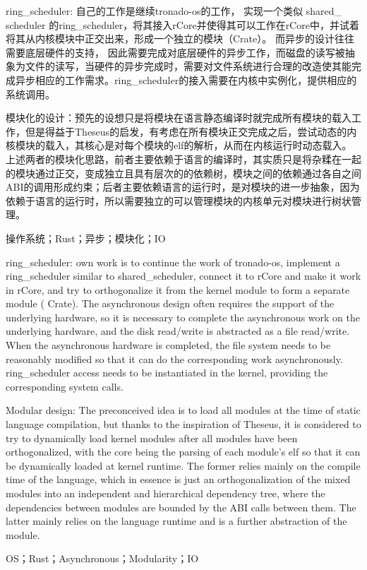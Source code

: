 \setlength{\headheight}{1.5cm}

\abstractcn

ring\_scheduler: 自己的工作是继续tronado-os的工作， 实现一个类似 shared\_ scheduler 的ring\_scheduler，将其接入rCore并使得其可以工作在rCore中，并试着将其从内核模块中正交出来，形成一个独立的模块（Crate）。 而异步的设计往往需要底层硬件的支持， 因此需要完成对底层硬件的异步工作，而磁盘的读写被抽象为文件的读写，当硬件的异步完成时，需要对文件系统进行合理的改造使其能完成异步相应的工作需求。ring\_scheduler的接入需要在内核中实例化，提供相应的系统调用。

模块化的设计：预先的设想只是将模块在语言静态编译时就完成所有模块的载入工作，但是得益于Theseus的启发，有考虑在所有模块正交完成之后，尝试动态的内核模块的载入，其核心是对每个模块的elf的解析，从而在内核运行时动态载入。上述两者的模块化思路，前者主要依赖于语言的编译时，其实质只是将杂糅在一起的模块通过正交，变成独立且具有层次的的依赖树，模块之间的依赖通过各自之间ABI的调用形成约束；后者主要依赖语言的运行时，是对模块的进一步抽象，因为依赖于语言的运行时，所以需要独立的可以管理模块的内核单元对模块进行树状管理。

\keywordscn\quad 操作系统；Rust；异步；模块化；IO
\abstracten

ring\_scheduler: own work is to continue the work of tronado-os, implement a ring\_scheduler similar to shared\_scheduler, connect it to rCore and make it work in rCore, and try to orthogonalize it from the kernel module to form a separate module ( Crate). The asynchronous design often requires the support of the underlying hardware, so it is necessary to complete the asynchronous work on the underlying hardware, and the disk read/write is abstracted as a file read/write. When the asynchronous hardware is completed, the file system needs to be reasonably modified so that it can do the corresponding work asynchronously. ring\_scheduler access needs to be instantiated in the kernel, providing the corresponding system calls.

Modular design: The preconceived idea is to load all modules at the time of static language compilation, but thanks to the inspiration of Theseus, it is considered to try to dynamically load kernel modules after all modules have been orthogonalized, with the core being the parsing of each module's elf so that it can be dynamically loaded at kernel runtime. The former relies mainly on the compile time of the language, which in essence is just an orthogonalization of the mixed modules into an independent and hierarchical dependency tree, where the dependencies between modules are bounded by the ABI calls between them. The latter mainly relies on the language runtime and is a further abstraction of the module.


\keywordsen\quad OS；Rust；Asynchronous；Modularity；IO